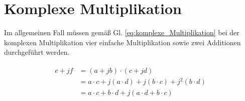 \section{Komplexe Multiplikation}

Im allgemeinen Fall müssen gemäß Gl. \ref{eq:komplexe_Multiplikation} bei der komplexen Multiplikation vier einfache Multiplikation sowie zwei Additionen durchgeführt werden.

\begin{align}\label{eq:komplexe_Multiplikation}
\begin{split}
 e + jf &= (a + jb) \cdot (c + jd)\\
        &= a \cdot c + j(a \cdot d) + j(b \cdot c) + j^2(b \cdot d)\\
        &= a \cdot c + b \cdot d + j(a \cdot d + b \cdot c)
\end{split}
\end{align}


